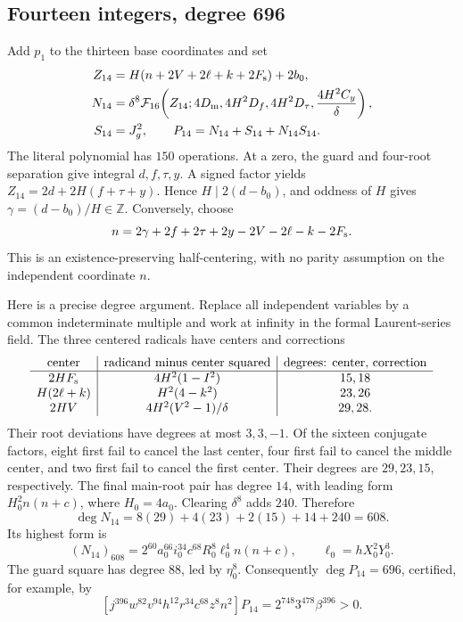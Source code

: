 \documentclass[11pt,a4paper]{article}
\theoremstyle{definition}\newtheorem{definition}[theorem]{Definition}
\theoremstyle{remark}\newtheorem{remark}[theorem]{Remark}
\newcommand{\Z}{\mathbb Z}\newcommand{\Q}{\mathbb Q}\newcommand{\N}{\mathbb N}
\newcommand{\F}{\mathcal F}\newcommand{\Cal}{\mathcal K}
\newcommand{\Dm}{D_{\rm m}}\newcommand{\Dt}{D_{\tau}}
\newcommand{\Df}{D_f}\newcommand{\Dy}{D_y}\newcommand{\Ag}{A_{\rm g}}
\numberwithin{equation}{section}
\begin{document}
\subsection{Fourteen integers, degree 696}
Add \(p_1\) to the thirteen base coordinates and set
\begin{align}
Z_{14}&=H(n+2V+2\ell+k+2F_{\rm s})+2b_0,\nonumber\\
N_{14}&=\delta^8\F_{16}\!
 \left(Z_{14};4\Dm,4H^2\Df,4H^2\Dt,\frac{4H^2C_y}{\delta}\right),
 \nonumber\\
S_{14}&=J_g^2,\qquad
P_{14}=N_{14}+S_{14}+N_{14}S_{14}.
\label{eq:four}
\end{align}
The literal polynomial has \(150\) operations.
At a zero, the guard and four-root separation give integral
\(d,f,\tau,y\). A signed factor yields
\(Z_{14}=2d+2H(f+\tau+y)\).
Hence \(H\mid2(d-b_0)\), and oddness of \(H\) gives
\(\gamma=(d-b_0)/H\in\Z\).
Conversely, choose
\[
n=2\gamma+2f+2\tau+2y-2V-2\ell-k-2F_{\rm s}.
\]
This is an existence-preserving half-centering, with no parity
assumption on the independent coordinate \(n\).

Here is a precise degree argument. Replace all independent variables
by a common indeterminate multiple and work at infinity in the
formal Laurent-series field. The three centered radicals have
centers and corrections
\[
\begin{array}{c|c|c}
\text{center}&\text{radicand minus center squared}&
 \text{degrees: center, correction}\\\hline
2HF_{\rm s}&4H^2(1-I^2)&15,18\\
H(2\ell+k)&H^2(4-k^2)&23,26\\
2HV&4H^2(V^2-1)/\delta&29,28 .
\end{array}
\]
Their root deviations have degrees at most \(3,3,-1\).
Of the sixteen conjugate factors, eight first fail to cancel the
last center, four first fail to cancel the middle center, and two
first fail to cancel the first center. Their degrees are
\(29,23,15\), respectively. The final main-root pair has degree
\(14\), with leading form \(H_0^2n(n+c)\), where \(H_0=4a_0\).
Clearing \(\delta^8\) adds \(240\). Therefore
\[
\deg N_{14}=8(29)+4(23)+2(15)+14+240=608.
\]
Its highest form is
\[
(N_{14})_{608}
 =2^{60}a_0^{66}i_0^{34}c^{68}R_0^8\ell_0^4n(n+c),
 \qquad \ell_0=hX_0^2Y_0^3.
\]
The guard square has degree \(88\), led by \(\eta_0^8\).
Consequently \(\deg P_{14}=696\), certified, for example, by
\[
[j^{396}w^{82}v^{94}h^{12}r^{34}c^{68}z^8n^2]P_{14}
 =2^{748}3^{478}\beta^{396}>0.
\]
\end{document}
